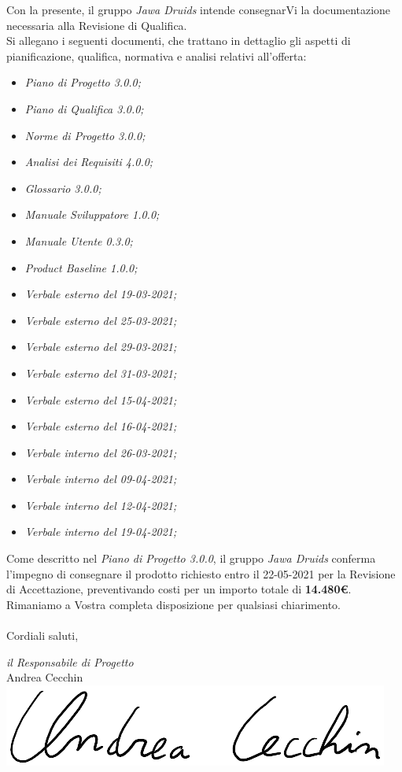 \documentclass[a4paper,12pt]{report}
\begin{document}
Con la presente, il gruppo \textit{Jawa Druids} intende consegnarVi la documentazione necessaria alla Revisione di Qualifica.
\vspace{1cm}
\\
Si allegano i seguenti documenti, che trattano in dettaglio gli aspetti di pianificazione, qualifica, normativa e analisi relativi all'offerta:
\begin{itemize}
  \item \textit{Piano di Progetto 3.0.0;}
  \item \textit{Piano di Qualifica 3.0.0;}
  \item \textit{Norme di Progetto 3.0.0;}
  \item \textit{Analisi dei Requisiti 4.0.0;}
  \item \textit{Glossario 3.0.0;}
  \item \textit{Manuale Sviluppatore 1.0.0;}
  \item \textit{Manuale Utente 0.3.0;}
  \item \textit{Product Baseline 1.0.0;}
  \item \textit{Verbale esterno del 19-03-2021;}
  \item \textit{Verbale esterno del 25-03-2021;}
  \item \textit{Verbale esterno del 29-03-2021;}
  \item \textit{Verbale esterno del 31-03-2021;}
  \item \textit{Verbale esterno del 15-04-2021;}
  \item \textit{Verbale esterno del 16-04-2021;}
  \item \textit{Verbale interno del 26-03-2021;}
  \item \textit{Verbale interno del 09-04-2021;}
  \item \textit{Verbale interno del 12-04-2021;}
  \item \textit{Verbale interno del 19-04-2021;}
\end{itemize}
\vspace{0.7cm}

Come descritto nel \textit{Piano di Progetto 3.0.0}, il gruppo \textit{Jawa Druids} conferma l’impegno di consegnare il prodotto richiesto entro il 22-05-2021 per la Revisione di Accettazione, preventivando costi per un importo totale di \textbf{14.480\euro}.\\
Rimaniamo a Vostra completa disposizione per qualsiasi chiarimento.\\
\vspace{0.3cm}
\\
Cordiali saluti,
\begin{flushright}
  \textit{il Responsabile di Progetto} \\
  Andrea Cecchin \\
  \includegraphics[width=0.3\linewidth]{immagini/firme/firma_andrea_c.png}\\[4ex]
\end{flushright}
\end{document}

